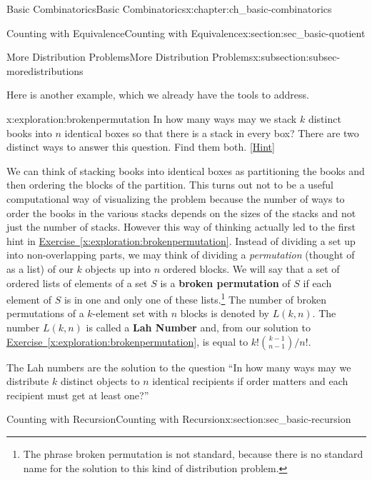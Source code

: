 \documentclass[oneside,10pt,]{book}
\newcommand{\terminology}[1]{\textbf{#1}}
\numberwithin{equation}{chapter}
\begin{document}
\begin{chapterptx}{Basic Combinatorics}{}{Basic Combinatorics}{}{}{x:chapter:ch_basic-combinatorics}
\begin{sectionptx}{Counting with Equivalence}{}{Counting with Equivalence}{}{}{x:section:sec_basic-quotient}
\begin{subsectionptx}{More Distribution Problems}{}{More Distribution Problems}{}{}{x:subsection:subsec-moredistributions}
\par
Here is another example, which we already have the tools to address.%
\begin{exploration}{}{x:exploration:brokenpermutation}%
In how many ways may we stack \(k\) distinct books into \(n\) identical boxes so that there is a stack in every box? There are two distinct ways to answer this question.  Find them both.%
\space\hspace*{0pt}\hfill{\tiny\hyperlink{g:hint:idm2533-back}{[Hint]}}\end{exploration}
We can think of stacking books into identical boxes as partitioning the books and then ordering the blocks of the partition. This turns out not to be a useful computational way of visualizing the problem because the number of ways to order the books in the various stacks depends on the sizes of the stacks and not just the number of stacks. However this way of thinking actually led to the first hint in \hyperref[x:exploration:brokenpermutation]{Exercise~\ref{x:exploration:brokenpermutation}}. Instead of dividing a set up into non-overlapping parts, we may think of dividing a \emph{permutation} (thought of as a list) of our \(k\) objects up into \(n\) ordered blocks. We will say that a set of ordered lists of elements of a set \(S\) is a \terminology{broken permutation}   of \(S\) if each element of \(S\) is in one and only one of these lists.\footnote{The phrase broken permutation is not standard, because there is no standard name for the solution to this kind  of distribution problem.\label{g:fn:idm2567}} The number of broken permutations of a \(k\)-element set with \(n\) blocks is denoted by \(L(k,n)\). The number \(L(k,n)\) is called a \terminology{Lah Number} and, from our solution to \hyperref[x:exploration:brokenpermutation]{Exercise~\ref{x:exploration:brokenpermutation}}, is equal to \(k!\binom{k-1}{n-1}/n!\).%
\par
The Lah numbers are the solution to the question ``In how many ways may we distribute \(k\) distinct objects to \(n\) identical recipients if order matters and each recipient must get at least one?''%
\end{subsectionptx}
\end{sectionptx}
%
%
\typeout{************************************************}
\typeout{************************************************}
%
\begin{sectionptx}{Counting with Recursion}{}{Counting with Recursion}{}{}{x:section:sec_basic-recursion}

\end{sectionptx}
\end{chapterptx}
\end{document}
